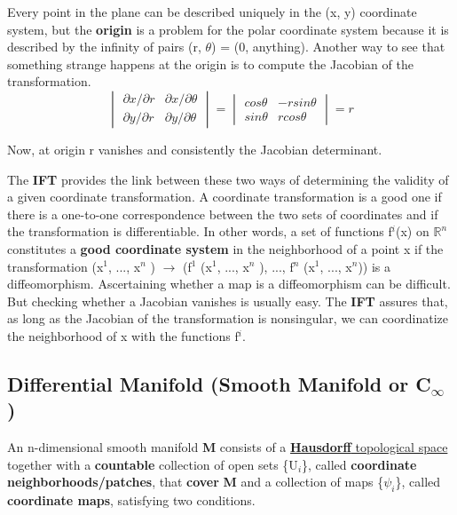 Every point in the plane can be described uniquely in the (x, y) coordinate system,
but the \textbf{origin} is a problem for the polar coordinate system because it is described
by the infinity of pairs (r, $\theta$) = (0, anything). Another way to see that something
strange happens at the origin is to compute the Jacobian of the transformation.
\begin{equation}
    \begin{vmatrix}
        \partial x / \partial r & \partial x / \partial \theta \\ 
        \partial y / \partial r & \partial y / \partial \theta 
   \end{vmatrix} = 
   \begin{vmatrix}
    cos \theta & -r sin \theta \\ 
    sin \theta & r cos \theta 
\end{vmatrix} = r
\end{equation}

Now, at origin r vanishes and consistently the Jacobian determinant.

The \textbf{IFT} provides the link between these two ways of
determining the validity of a given coordinate transformation. A coordinate transformation is a good one 
if there is a one-to-one correspondence between the two sets of coordinates and if the transformation is differentiable.
In other words, a set of functions {f$^i$(x)} on $\mathbb{R}^n$ constitutes a \textbf{good coordinate system} in the 
neighborhood of a point x if the transformation (x$^1$, ..., x$^n$ ) $\rightarrow$ (f$^1$ (x$^1$, ..., x$^n$ ), ..., f$^n$ (x$^1$, ..., x$^n$)) is a diffeomorphism.
Ascertaining whether a map is a diffeomorphism can be difficult. 
But checking whether a Jacobian vanishes is usually easy. 
The \textbf{IFT} assures that, as long as the Jacobian of the transformation is nonsingular, 
we can coordinatize the neighborhood of x with the functions f$^i$.

\subsection{Differential Manifold (Smooth Manifold or C\texorpdfstring{$_\infty$ } d)}
An n-dimensional smooth manifold \textbf{M} consists of a  \href{https://en.wikipedia.org/wiki/Hausdorff_space}{\textbf{Hausdorff} topological space}
together with a \textbf{countable} collection of open sets \{U$_i$\}, called \textbf{coordinate neighborhoods/patches}, 
that \textbf{cover} \textbf{M} and a collection of maps \{$\psi_i$\}, called \textbf{coordinate
maps}, satisfying two conditions.

